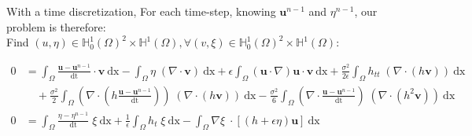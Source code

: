 \documentclass[compress,t]{beamer}
\begin{document}
			\begin{frame}
			\vfill
			With a time discretization, For each time-step, knowing $\mathbf{u}^{n-1}$ and $\eta^{n-1}$, our problem is therefore:\\
			\vfill
			Find $(u,\eta) \in \mathbb{H}^1_0(\Omega)^2 \times \mathbb{H}^1(\Omega), \forall (v,\xi) \in \mathbb{H}^1_0(\Omega)^2 \times \mathbb{H}^1(\Omega)$:  
				\begin{scriptsize}
					\begin{equation*}
						\begin{split}
							0 &= \int_{\Omega} \! \frac{\mathbf{u} - \mathbf{u}^{n-1}}{\mathrm{dt}} \cdot \mathbf{v} \: \mathrm{dx} 	- \int_{\Omega} \! \eta \; (\nabla \cdot \mathbf{v}) \: \mathrm{dx} + 	\epsilon \! \int_{\Omega} \! (\mathbf{u} \cdot \nabla ) \mathbf{u} \cdot \mathbf{v} \: \mathrm{dx} + \frac{\sigma^2}{2 \epsilon} \! \int_{\Omega} \!  h_{tt}  \; (\nabla \cdot( h \mathbf{v})) \: \mathrm{dx} \\ 
					&\quad + \frac{\sigma^2}{2} \! \int_{\Omega} \!  (\nabla \cdot (h \frac{\mathbf{u} - \mathbf{u}^{n-1}}{\mathrm{dt}})) \; (\nabla \cdot (h \mathbf{v}) )\: \mathrm{dx} - \frac{\sigma^2}{6} \! \int_{\Omega} \! (\nabla 	\cdot \frac{\mathbf{u} - \mathbf{u}^{n-1}}{\mathrm{dt}}) \; (\nabla  \cdot (h^2  \mathbf{v})) \: \mathrm{dx} \\
					\displaystyle 0 &= \int_{\Omega}\! \frac{\eta - \eta^{n-1}}{\mathrm{dt}} \; \xi \: \mathrm{dx} +\frac{1}{\epsilon}\int_{\Omega}\! h_t \; \xi \: \mathrm{dx} - \int_{\Omega}\! \nabla \xi \; \cdot [(h+\epsilon\eta) \mathbf{u}]  \: 	\mathrm{dx}
				\end{split}
			\end{equation*}
				\end{scriptsize}
				\vfill
			\end{frame}
			
\end{document}
